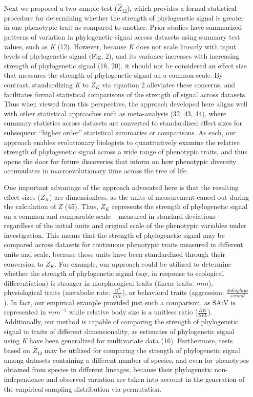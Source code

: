 \documentclass[9pt,twocolumn,twoside,lineno]{pnas-new}
\begin{document}
Next we proposed a two-sample test (\(\hat{Z}_{12}\)), which provides a
formal statistical procedure for determining whether the strength of
phylogenetic signal is greater in one phenotypic trait as compared to
another. Prior studies have summarized patterns of variation in
phylogenetic signal across datasets using summary test values, such as
\emph{K} (12). However, because \emph{K} does not scale linearly with
input levels of phylogenetic signal (Fig. 2), and its variance increases
with increasing strength of phylogenetic signal (18, 20), it should not
be considered an effect size that measures the strength of phylogenetic
signal on a common scale. By contrast, standardizing \emph{K} to \(Z_K\)
via equation 2 alleviates these concerns, and facilitates formal
statistical comparisons of the strength of signal across datasets. Thus
when viewed from this perspective, the approach developed here aligns
well with other statistical approaches such as meta-analysis (32, 43,
44), where summary statistics across datasets are converted to
standardized effect sizes for subsequent ``higher order'' statistical
summaries or comparisons. As such, our approach enables evolutionary
biologists to quantitatively examine the relative strength of
phylogenetic signal across a wide range of phenotypic traits, and thus
opens the door for future discoveries that inform on how phenotypic
diversity accumulates in macroevolutionary time across the tree of life.

One important advantage of the approach advocated here is that the
resulting effect sizes (\(Z_K\)) are dimensionless, as the units of
measurement cancel out during the calculation of \(Z\) (45). Thus,
\(Z_K\) represents the strength of phylogenetic signal on a common and
comparable scale -- measured in standard deviations -- regardless of the
initial units and original scale of the phenotypic variables under
investigation. This means that the strength of phylogenetic signal may
be compared across datasets for continuous phenotypic traits measured in
different units and scale, because those units have been standardized
through their conversion to \(Z_K\). For example, our approach could be
utilized to determine whether the strength of phylogenetic signal (say,
in response to ecological differentiation) is stronger in morphological
traits (linear traits: \(mm\)), physiological traits (metabolic rate:
\(\frac{O^2}{min}\)), or behavioral traits (aggression:
\(\frac{\#{displays}}{second}\)). In fact, our empirical example
provided just such a comparison, as SA:V is represented in \(mm^{-1}\)
while relative body size is a unitless ratio (\(\frac{BW}{SVL}\)).
Additionally, our method is capable of comparing the strength of
phylogenetic signal in traits of different dimensionality, as estimates
of phylogenetic signal using \emph{K} have been generalized for
multivariate data (16). Furthermore, tests based on \(\hat{Z}_{12}\) may
be utilized for comparing the strength of phylogenetic signal among
datasets containing a different number of species, and even for
phenotypes obtained from species in different lineages, because their
phylogenetic non-independence and observed variation are taken into
account in the generation of the empirical sampling distribution via
permutation.
\end{document}
